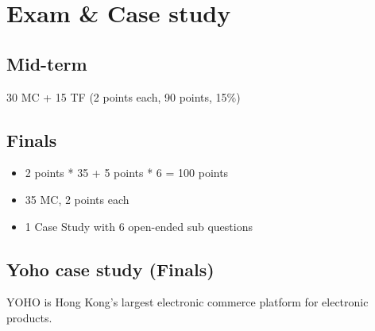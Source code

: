 \section{Exam \& Case study}
\subsection{Mid-term}
30 MC + 15 TF (2 points each, 90 points, 15\%)
\subsection{Finals}
\begin{itemize}
    \item 2 points * 35 + 5 points * 6 = 100 points
    \item 35 MC, 2 points each
    \item 1 Case Study with 6 open-ended sub questions
\end{itemize}

\subsection{Yoho case study (Finals)}

YOHO is Hong Kong's largest electronic commerce platform for electronic products.

